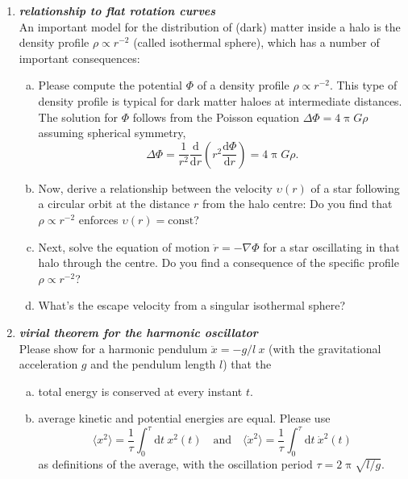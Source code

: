 \documentclass[a4paper,12pt]{article}
\newcommand{\question}[1]{\textbf{\textit{#1}}}
\newcommand{\dd}{\mathrm{d}}
\renewcommand{\pi}{\uppi}
\newcommand{\bra}{\langle}
\newcommand{\ket}{\rangle}
\begin{document}
\begin{enumerate}
\item \question{relationship to flat rotation curves}\\
An important model for the distribution of (dark) matter inside a halo is the density profile $\rho\propto r^{-2}$ (called isothermal sphere), which has a number of important consequences:
\begin{enumerate}[(a)]
\item{Please compute the potential $\Phi$ of a density profile $\rho\propto r^{-2}$. This type of density profile is typical for dark matter haloes at intermediate distances. The solution for $\Phi$ follows from the Poisson equation $\Delta\Phi = 4\pi G\rho$ assuming spherical symmetry,
\begin{equation}
\Delta\Phi = \frac{1}{r^2}\frac{\dd}{\dd r}\left(r^2\frac{\dd\Phi}{\dd r}\right) = 4\pi G\rho.
\end{equation}
}
\item{Now, derive a relationship between the velocity $\upsilon(r)$ of a star following a circular orbit at the distance $r$ from the halo centre: Do you find that $\rho\propto r^{-2}$ enforces $\upsilon(r) = \mathrm{const}$?}
\item{Next, solve the equation of motion $\ddot{r} = -\nabla\Phi$ for a star oscillating in that halo through the centre. Do you find a consequence of the specific profile $\rho\propto r^{-2}$?}
\item{What's the escape velocity from a singular isothermal sphere?}
\end{enumerate}


\item \question{virial theorem for the harmonic oscillator}\\
Please show for a harmonic pendulum $\ddot{x} = -g/l\:x$ (with the gravitational acceleration $g$ and the pendulum length $l$) that the
\begin{enumerate}[(a)]
\item total energy is conserved at every instant $t$.
\item average kinetic and potential energies are equal. Please use
\begin{equation}
\bra x^2\ket = \frac{1}{\tau}\int_0^\tau\dd t\:x^2(t)
\quad\mathrm{and}\quad
\bra \dot{x}^2\ket = \frac{1}{\tau}\int_0^\tau\dd t\:\dot{x}^2(t)
\end{equation}
as definitions of the average, with the oscillation period $\tau = 2\pi\sqrt{l/g}$.
\end{enumerate}



\end{enumerate}
\end{document}
